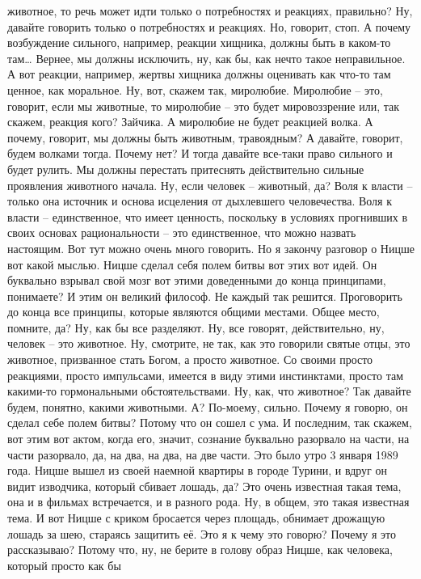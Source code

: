 животное, то речь может идти только о потребностях и реакциях, правильно? Ну,
давайте говорить только о потребностях и реакциях. Но, говорит, стоп. А почему
возбуждение сильного, например, реакции хищника, должны быть в каком-то там…
Вернее, мы должны исключить, ну, как бы, как нечто такое неправильное. А вот
реакции, например, жертвы хищника должны оценивать как что-то там ценное, как
моральное. Ну, вот, скажем так, миролюбие. Миролюбие – это, говорит, если мы
животные, то миролюбие – это будет мировоззрение или, так скажем, реакция кого?
Зайчика. А миролюбие не будет реакцией волка. А почему, говорит, мы должны быть
животным, травоядным? А давайте, говорит, будем волками тогда. Почему нет? И
тогда давайте все-таки право сильного и будет рулить. Мы должны перестать
притеснять действительно сильные проявления животного начала. Ну, если человек –
животный, да? Воля к власти – только она источник и основа исцеления от
дыхлевшего человечества. Воля к власти – единственное, что имеет ценность,
поскольку в условиях прогнивших в своих основах рациональности – это
единственное, что можно назвать настоящим. Вот тут можно очень много говорить.
Но я закончу разговор о Ницше вот какой мыслью. Ницше сделал себя полем битвы
вот этих вот идей. Он буквально взрывал свой мозг вот этими доведенными до конца
принципами, понимаете? И этим он великий философ. Не каждый так решится.
Проговорить до конца все принципы, которые являются общими местами. Общее место,
помните, да? Ну, как бы все разделяют. Ну, все говорят, действительно, ну,
человек – это животное. Ну, смотрите, не так, как это говорили святые отцы, это
животное, призванное стать Богом, а просто животное. Со своими просто реакциями,
просто импульсами, имеется в виду этими инстинктами, просто там какими-то
гормональными обстоятельствами. Ну, как, что животное? Так давайте будем,
понятно, какими животными. А? По-моему, сильно. Почему я говорю, он сделал себе
полем битвы? Потому что он сошел с ума. И последним, так скажем, вот этим вот
актом, когда его, значит, сознание буквально разорвало на части, на части
разорвало, да, на два, на два, на две части. Это было утро 3 января 1989 года.
Ницше вышел из своей наемной квартиры в городе Турини, и вдруг он видит
изводчика, который сбивает лошадь, да? Это очень известная такая тема, она и в
фильмах встречается, и в разного рода. Ну, в общем, это такая известная тема. И
вот Ницше с криком бросается через площадь, обнимает дрожащую лошадь за шею,
стараясь защитить её. Это я к чему это говорю? Почему я это рассказываю? Потому
что, ну, не берите в голову образ Ницше, как человека, который просто как бы

